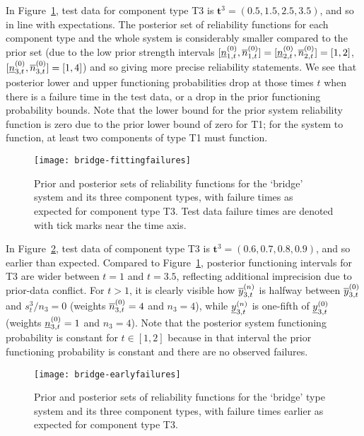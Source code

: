 \documentclass[12pt, a4paper]{elsarticle}
\newcommand{\bs}[1]{\boldsymbol{#1}}
\renewcommand{\vec}[1]{{\bs#1}}
\begin{document}
In Figure~\ref{fig:bridge-fitting}, 
test data for component type T3 is $\vec{t}^3 = (0.5, 1.5, 2.5, 3.5)$,
and so in line with expectations.
The posterior set of reliability functions for each component type and the whole system
is considerably smaller compared to the prior set
(due to the low prior strength intervals
$[\underline{n}^{(0)}_{1,t},\overline{n}^{(0)}_{1,t}] = [\underline{n}^{(0)}_{2,t},\overline{n}^{(0)}_{2,t}] = [1,2]$, $[\underline{n}^{(0)}_{3,t},\overline{n}^{(0)}_{3,t}] = [1,4]$)
and so giving more precise reliability statements.
We see that posterior lower and upper functioning probabilities drop at those times $t$
when there is a failure time in the test data,
or a drop in the prior functioning probability bounds.
Note that the lower bound for the prior system reliability function is zero
due to the prior lower bound of zero for T1;
for the system to function, at least two components of type T1 must function.

\begin{figure}
\texttt{[image: bridge-fittingfailures]}
\caption{Prior and posterior sets of reliability functions for the `bridge' system and its three component types,
with failure times as expected for component type T3.
Test data failure times are denoted with tick marks near the time axis.}
\label{fig:bridge-fitting}
\end{figure}

In Figure~\ref{fig:bridge-early},
test data of component type T3 is $\vec{t}^3 = (0.6, 0.7, 0.8, 0.9)$,
and so earlier than expected.
Compared to Figure~\ref{fig:bridge-fitting},
posterior functioning intervals for T3 are wider between $t=1$ and $t=3.5$,
reflecting additional imprecision due to prior-data conflict.
For $t > 1$, it is clearly visible how $\overline{y}^{(n)}_{3,t}$ is halfway between $\overline{y}^{(0)}_{3,t}$ and $s_t^3/n_3 = 0$
(weights $\overline{n}^{(0)}_{3,t} = 4$ and $n_3 = 4$),
while $\underline{y}^{(n)}_{3,t}$ is one-fifth of $\underline{y}^{(0)}_{3,t}$
(weights $\underline{n}^{(0)}_{3,t} = 1$ and $n_3 = 4$).
Note that the posterior system functioning probability is constant for $t \in [1,2]$
because in that interval the prior functioning probability is constant
and there are no observed failures.

\begin{figure}
\texttt{[image: bridge-earlyfailures]}
\caption{Prior and posterior sets of reliability functions for the `bridge' type system and its three component types,
with failure times earlier as expected for component type T3.}
\label{fig:bridge-early}
\end{figure}
\end{document}
